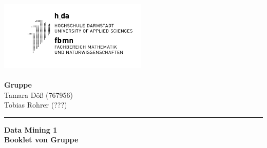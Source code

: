 \hspace{-1.4cm}
\parbox[b][80pt][b]{80pt}{
	\includegraphics[width=200pt,height=100pt]{Bilder/hda_fbmn.png}}
\hfill
\parbox[b][75pt][t]{260pt}{
	\hspace*{\fill}\textbf{Gruppe \Gruppe} \\ 
	\hspace*{\fill} Tamara Döß (767956) \\
	\hspace*{\fill} Tobias Rohrer (???)\\
	\hspace*{\fill} }
\vspace{-0.2cm}
\hrule
\vspace{5mm}
\begin{center}
	{\bf\huge Data Mining 1\\[10mm]}
	{\bf \large Booklet von Gruppe \Gruppe}
\end{center}
\vspace{1cm}
\tableofcontents
\pagebreak
\addtocounter{secnumdepth}{-1}
